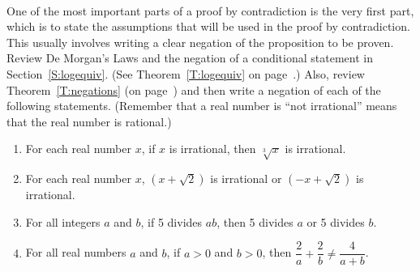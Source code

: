 \begin{prog}\label{pr:start-con} \hfill \\
One of the most important parts of a proof by contradiction is the very first part, which is to state the assumptions that will be used in the proof by contradiction.  This usually involves writing a clear negation of the proposition to be proven.  Review De Morgan's Laws and the negation of a conditional statement in Section~\ref{S:logequiv}.  (See Theorem~\ref{T:logequiv} on page~\pageref{T:logequiv}.)  Also, review Theorem~\ref{T:negations} (on page~\pageref{T:negations}) and then write a negation of each of the following statements.  (Remember that a real number is ``not irrational'' means that the real number is rational.)

\begin{enumerate}
\item For each real number $x$, if $x$ is irrational, then $\sqrt[3]{x}$ is irrational.
\item For each real number $x$, $\left(x + \sqrt{2} \right)$ is irrational or 
$\left(-x + \sqrt{2} \right)$ is irrational.
\item For all integers $a$ and $b$, if 5 divides $ab$, then 5 divides $a$ or 5 divides $b$.
\item For all real numbers $a$ and $b$, if $a > 0$ and $b > 0$, then 
$\dfrac{2}{a} + \dfrac{2}{b} \ne \dfrac{4}{a + b}$.
\end{enumerate}
\end{prog}
\hbreak

\endinput
